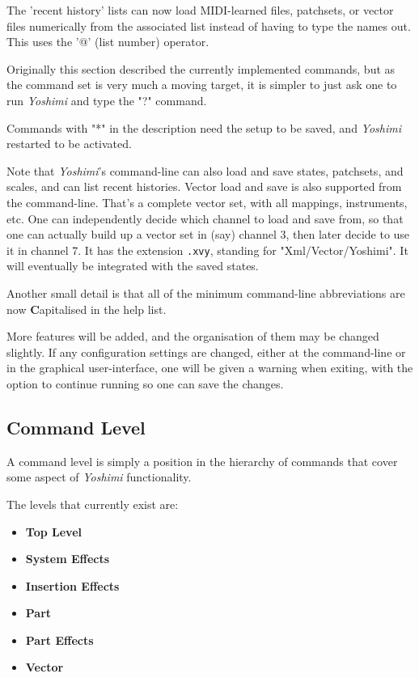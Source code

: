    The 'recent history' lists can now load MIDI-learned files, patchsets, or
   vector files numerically from the associated list instead of having to type
   the names out.  This uses the '@' (list number) operator.

   Originally this section described the currently implemented commands,
   but as the command set is very much a moving target, it is simpler to just
   ask one to run \textsl{Yoshimi} and type the "?" command.

   Commands with "*" in the description need the setup to be saved,
   and \textsl{Yoshimi} restarted to be activated. 

   Note that \textsl{Yoshimi}'s command-line can also load and save states,
   patchsets, and scales, and can list recent histories.
   Vector load and save is also supported from the command-line.
   That's a complete vector set, with all mappings, instruments, etc.
   One can independently decide which
   channel to load and save from, so that one
   can actually build up a vector set in
   (say) channel 3, then later decide to use it in channel 7.
   It has the extension \texttt{.xvy}, standing for "Xml/Vector/Yoshimi".
   It will eventually be integrated with the saved states.

   Another small detail is that all of the minimum command-line
   abbreviations are now \textbf{C}apitalised in the help list.     

   More features will be added, and the organisation of them may be changed
   slightly.  If any configuration settings are changed, either at the
   command-line or in the graphical user-interface, one will be given a warning
   when exiting, with the option to continue running so one can save the
   changes.

\subsection{Command Level}
\label{subsec:command_line_command_level}

   A command level is simply a position in the hierarchy of commands that cover
   some aspect of \textsl{Yoshimi} functionality.

   The levels that currently exist are:

   \begin{itemize}
      \item \textbf{Top Level}
      \item \textbf{System Effects}
      \item \textbf{Insertion Effects}
      \item \textbf{Part}
      \item \textbf{Part Effects}
      \item \textbf{Vector}
   \end{itemize}

